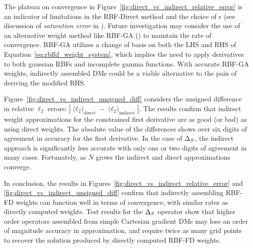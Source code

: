 The plateau on convergence in Figure~\ref{fig:direct_vs_indirect_relative_error} is an indicator of limitations in the RBF-Direct method and the choice of $\epsilon$ (see discussion of \emph{saturation error} in \cite{FlyerFornberg11,Fasshauer2007}). Future investigation may consider the use of an alternative weight method like RBF-GA (\cite{Fornberg2012}) to maintain the rate of convergence. RBF-GA utilizes a change of basis on both the LHS and RHS of Equation~\ref{eq:rbffd_weight_system}, which implies the need to apply derivatives to both gaussian RBFs and incomplete gamma functions. With accurate RBF-GA weights, indirectly assembled DMs could be a viable alternative to the pain of deriving the modified RHS. 

Figure~\ref{fig:direct_vs_indirect_unsigned_diff} considers the unsigned difference in relative $\ell_2$ errors: $| \text{($\ell_{2}$)}_{\text{direct}} - \text{($\ell_{2}$)}_{\text{indirect}} |$. The results confirm that indirect weight approximations for the constrained first derivative are as good (or bad) as using direct weights. The absolute value of the differences shows over six digits of agreement in accuracy for the first derivative. In the case of $\Delta_S$, the indirect approach is significantly less accurate with only one or two digits of agreement in many cases. Fortunately, as $N$ grows the indirect and direct approximations converge. 

In conclusion, the results in Figures~\ref{fig:direct_vs_indirect_relative_error} and \ref{fig:direct_vs_indirect_unsigned_diff} confirm that indirectly assembling RBF-FD weights can function well in terms of convergence, with similar rates as directly computed weights. Test results for the $\Delta_S$ operator show that higher order operators assembled from simple Cartesian gradient DMs may lose an order of magnitude accuracy in approximation, and require twice as many grid points to recover the solution produced by directly computed RBF-FD weights. 




